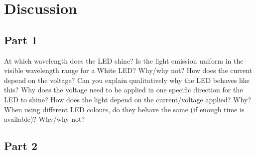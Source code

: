 \section{Discussion}
\subsection{Part 1}
At which wavelength does the LED shine? Is the light emission uniform in the visible
wavelength range for a White LED? Why/why not?
How does the current depend on the voltage?
Can you explain qualitatively why the LED behaves like this?
Why does the voltage need to be applied in one specific direction for the LED to shine?
How does the light depend on the current/voltage applied? Why?
When using different LED colours, do they behave the same (if enough time is available)?
Why/why not?


\subsection{Part 2}